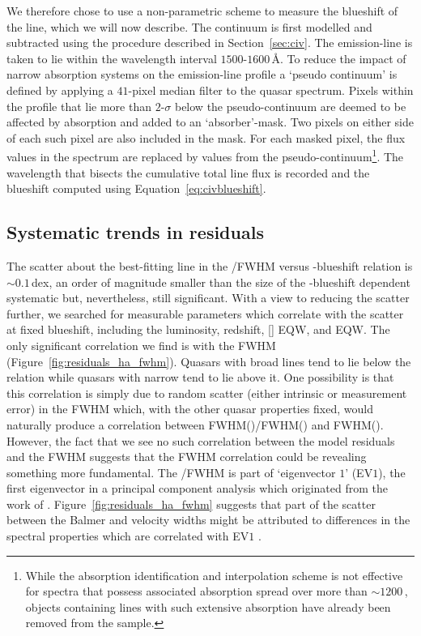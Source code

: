 We therefore chose to use a non-parametric scheme to measure the blueshift of the  line, which we will now describe. 
The continuum is first modelled and subtracted using the procedure described in Section~\ref{sec:civ}. 
The  emission-line is taken to lie within the wavelength interval $1500$-$1600$\,\AA. 
To reduce the impact of narrow absorption systems on the emission-line profile a `pseudo continuum' is defined by applying a $41$-pixel median filter to the quasar spectrum.
Pixels within the  profile that lie more than $2$-$\sigma$ below the pseudo-continuum are deemed to be affected by absorption and added to an `absorber'-mask. 
Two pixels on either side of each such pixel are also included in the mask. 
For each masked pixel, the flux values in the spectrum are replaced by values from the pseudo-continuum\footnote{While the absorption identification and interpolation scheme is not effective for spectra that possess
associated absorption spread over more than $\sim1200$\,\kms, objects containing  lines with such extensive absorption have already been removed from the sample.}. 
The wavelength that bisects the cumulative total line flux is recorded and the blueshift computed using Equation~\ref{eq:civblueshift}. 

\subsection{Systematic trends in residuals}
\label{sec:ch3-residuals}

The scatter about the best-fitting line in the /\ha FWHM versus -blueshift relation is $\sim0.1$\,dex, an order of magnitude smaller than the size of the -blueshift dependent systematic but, nevertheless, still significant.
With a view to reducing the scatter further, we searched for measurable parameters which correlate with the scatter at fixed  blueshift, including the luminosity, redshift, [] EQW, and  EQW.
The only significant correlation we find is with the \ha FWHM (Figure~\ref{fig:residuals_ha_fwhm}).
Quasars with broad \ha lines tend to lie below the relation while quasars with narrow \ha tend to lie above it.
One possibility is that this correlation is simply due to random scatter (either intrinsic or measurement error) in the \ha FWHM which, with the other quasar properties fixed, would naturally produce a correlation between FWHM()/FWHM(\hans) and FWHM(\hans).
However, the fact that we see no such correlation between the model residuals and the  FWHM suggests that the \ha FWHM correlation could be revealing something more fundamental. 
The \hans/\hb FWHM is part of `eigenvector $1$' (EV$1$), the first eigenvector in a principal component analysis which originated from the work of \citet{boroson92}.    
Figure~\ref{fig:residuals_ha_fwhm} suggests that part of the scatter between the Balmer and  velocity widths might be attributed to differences in the spectral properties which are correlated with EV$1$ \citep{marziani13}. 

